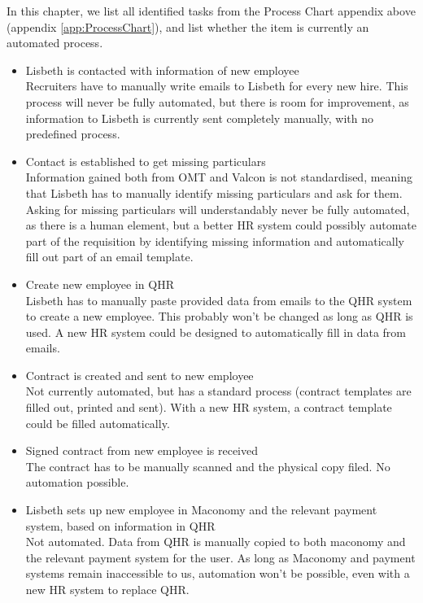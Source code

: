 In this chapter, we list all identified tasks from the Process Chart appendix above (appendix \ref*{app:ProcessChart}), and list whether the item is currently an automated process. 

\begin{itemize}
	\item{Lisbeth is contacted with information of new employee}\\
		Recruiters have to manually write emails to Lisbeth for every new hire. This process will never be fully automated, but there is room for improvement, as information to Lisbeth is currently sent completely manually, with no predefined process. 
		
	\item{Contact is established to get missing particulars}\\
		Information gained both from OMT and Valcon is not standardised, meaning that Lisbeth has to manually identify missing particulars and ask for them. Asking for missing particulars will understandably never be fully automated, as there is a human element, but a better HR system could possibly automate part of the requisition by identifying missing information and automatically fill out part of an email template.
		
	\item{Create new employee in QHR}\\
		Lisbeth has to manually paste provided data from emails to the QHR system to create a new employee. This probably won't be changed as long as QHR is used. A new HR system could be designed to automatically fill in data from emails.
	
	\item{Contract is created and sent to new employee}\\
		Not currently automated, but has a standard process (contract templates are filled out, printed and sent).
		With a new HR system, a contract template could be filled automatically.
	
	\item{Signed contract from new employee is received}\\
		The contract has to be manually scanned and the physical copy filed. No automation possible.
	
	\item{Lisbeth sets up new employee in Maconomy and the relevant payment system, based on information in QHR}\\
		Not automated. Data from QHR is manually copied to both maconomy and the relevant payment system for the user.
		As long as Maconomy and payment systems remain inaccessible to us, automation won't be possible, even with a new HR system to replace QHR.
	

\end{itemize}
